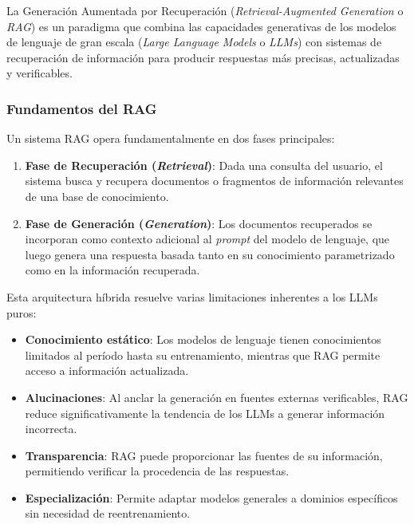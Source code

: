 \documentclass[12pt,letterpaper]{article}
\begin{document}
La Generación Aumentada por Recuperación (\textit{Retrieval-Augmented Generation} o \textit{RAG}) \cite{lewis2020retrieval} es un paradigma que combina las capacidades generativas de los modelos de lenguaje de gran escala (\textit{Large Language Models} o \textit{LLMs}) con sistemas de recuperación de información para producir respuestas más precisas, actualizadas y verificables.

\subsubsection{Fundamentos del RAG}

Un sistema RAG opera fundamentalmente en dos fases principales:

\begin{enumerate}
    \item \textbf{Fase de Recuperación (\textit{Retrieval})}: Dada una consulta del usuario, el sistema busca y recupera documentos o fragmentos de información relevantes de una base de conocimiento.

    \item \textbf{Fase de Generación (\textit{Generation})}: Los documentos recuperados se incorporan como contexto adicional al \textit{prompt} del modelo de lenguaje, que luego genera una respuesta basada tanto en su conocimiento parametrizado como en la información recuperada.
\end{enumerate}

Esta arquitectura híbrida resuelve varias limitaciones inherentes a los LLMs puros:

\begin{itemize}
    \item \textbf{Conocimiento estático}: Los modelos de lenguaje tienen conocimientos limitados al período hasta su entrenamiento, mientras que RAG permite acceso a información actualizada.

    \item \textbf{Alucinaciones}: Al anclar la generación en fuentes externas verificables, RAG reduce significativamente la tendencia de los LLMs a generar información incorrecta.

    \item \textbf{Transparencia}: RAG puede proporcionar las fuentes de su información, permitiendo verificar la procedencia de las respuestas.

    \item \textbf{Especialización}: Permite adaptar modelos generales a dominios específicos sin necesidad de reentrenamiento.
\end{itemize}
\end{document}
